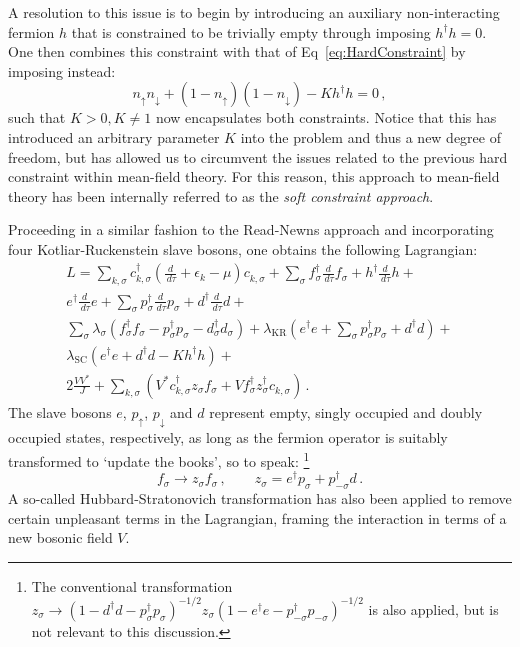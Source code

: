 \documentclass[12pt]{article}
\begin{document}
A resolution to this issue is to begin by introducing an auxiliary non-interacting fermion $ h $ that is constrained to be trivially empty through imposing $ h^{\dagger} h = 0 $. One then combines this constraint with that of Eq~\eqref{eq:HardConstraint} by imposing instead: \begin{equation} n_{\uparrow} n_{\downarrow} + (1 - n_{\uparrow})(1 - n_{\downarrow}) - K h^{\dagger} h = 0\,, \end{equation} such that $ K > 0, K \neq 1 $ now encapsulates both constraints. Notice that this has introduced an arbitrary parameter $ K $ into the problem and thus a new degree of freedom, but has allowed us to circumvent the issues related to the previous hard constraint within mean-field theory. For this reason, this approach to mean-field theory has been internally referred to as the \emph{soft constraint approach}.

Proceeding in a similar fashion to the Read-Newns approach and incorporating four Kotliar-Ruckenstein \cite{KotliarRuckenstein} slave bosons, one obtains the following Lagrangian: \begin{eqnarray} L = \sum_{k,\sigma} c^{\dagger}_{k,\sigma} \left( \frac{d}{\,d\tau} + \epsilon_k - \mu \right) c^{}_{k,\sigma} + \sum_{\sigma} f^{\dagger}_{\sigma} \frac{d}{\,d\tau} f^{}_{\sigma} + h^{\dagger} \frac{d}{\,d\tau}h + \\
e^{\dagger} \frac{d}{\,d\tau} e  + \sum_{\sigma} p^{\dagger}_{\sigma} \frac{d}{\,d\tau} p^{}_{\sigma} + d^{\dagger} \frac{d}{\,d\tau} d + \\
\sum_{\sigma} \lambda^{}_{\sigma} (f^{\dagger}_{\sigma} f^{}_{\sigma} - p^{\dagger}_{\sigma} p^{}_{\sigma} - d^{\dagger}_{\sigma} d^{}_\sigma ) + \lambda_{\text{KR}} \left( e^{\dagger} e + \sum_{\sigma} p^{\dagger}_{\sigma} p^{}_{\sigma} + d^{\dagger} d \right) + \\
\lambda_{\text{SC}} ( e^{\dagger} e + d^{\dagger} d - K h^{\dagger} h) + \\
2 \frac{V V^{\ast}}{J} + \sum_{k,\sigma} \left( V^{\ast} c^{\dagger}_{k,\sigma} z^{}_{\sigma} f^{}_{\sigma} + V f^{\dagger}_{\sigma} z^{\dagger}_{\sigma} c^{}_{k,\sigma} \right) \,. \end{eqnarray} The slave bosons $ e $, $ p_{\uparrow} $, $ p_{\downarrow} $ and $ d $ represent empty, singly occupied and doubly occupied states, respectively, as long as the fermion operator is suitably transformed to `update the books', so to speak: \footnote{The conventional transformation $ z^{}_{\sigma} \rightarrow (1 - d^{\dagger} d - p^{\dagger}_{\sigma} p^{}_{\sigma})^{- 1 / 2} z^{}_{\sigma} (1 - e^{\dagger} e - p^{\dagger}_{- \sigma} p^{}_{- \sigma})^{- 1 / 2} $ is also applied, but is not relevant to this discussion.} \begin{equation} f^{}_{\sigma} \rightarrow z^{}_{\sigma} f^{}_{\sigma}\,, \qquad z_{\sigma} = e^{\dagger} p^{}_{\sigma} + p^{\dagger}_{-\sigma} d \,. \end{equation} A so-called Hubbard-Stratonovich transformation has also been applied to remove certain unpleasant terms in the Lagrangian, framing the interaction in terms of a new bosonic field $ V $.
\end{document}

